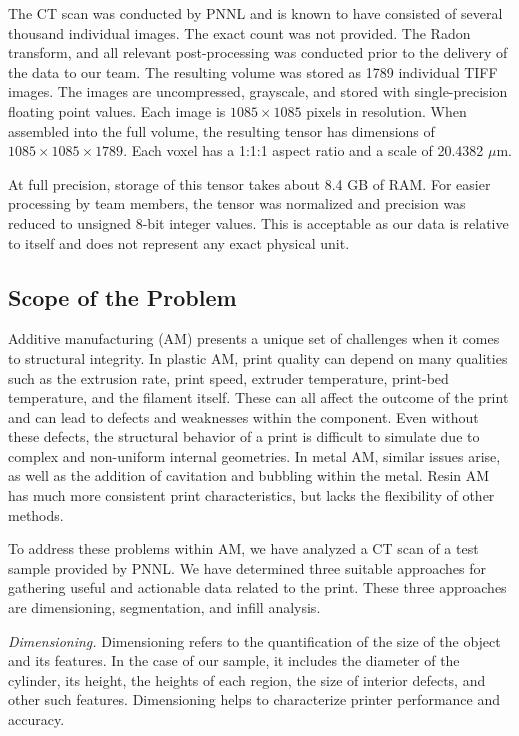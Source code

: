\documentclass[11pt, letterpaper]{article}
\begin{document}
    The CT scan was conducted by PNNL and is known to have consisted of several thousand individual images. The exact count was not provided. The Radon transform, and all relevant post-processing was conducted prior to the delivery of the data to our team. The resulting volume was stored as 1789 individual TIFF images. The images are uncompressed, grayscale, and stored with single-precision floating point values. Each image is $1085 \times 1085$ pixels in resolution. When assembled into the full volume, the resulting tensor has dimensions of $1085\times1085\times1789$. Each voxel has a 1:1:1 aspect ratio and a scale of 20.4382 $\mu$m.
    
    At full precision, storage of this tensor takes about 8.4 GB of RAM. For easier processing by team members, the tensor was normalized and precision was reduced to unsigned 8-bit integer values. This is acceptable as our data is relative to itself and does not represent any exact physical unit.

\subsection{Scope of the Problem}
    Additive manufacturing (AM) presents a unique set of challenges when it comes to structural integrity. In plastic AM, print quality can depend on many qualities such as the extrusion rate, print speed, extruder temperature, print-bed temperature, and the filament itself. These can all affect the outcome of the print and can lead to defects and weaknesses within the component. Even without these defects, the structural behavior of a print is difficult to simulate due to complex and non-uniform internal geometries. In metal AM, similar issues arise, as well as the addition of cavitation and bubbling within the metal. Resin AM has much more consistent print characteristics, but lacks the flexibility of other methods.

    To address these problems within AM, we have analyzed a CT scan of a test sample provided by PNNL. We have determined three suitable approaches for gathering useful and actionable data related to the print. These three approaches are dimensioning, segmentation, and infill analysis.

    \emph{Dimensioning.} Dimensioning refers to the quantification of the size of the object and its features. In the case of our sample, it includes the diameter of the cylinder, its height, the heights of each region, the size of interior defects, and other such features. Dimensioning helps to characterize printer performance and accuracy.
\end{document}
